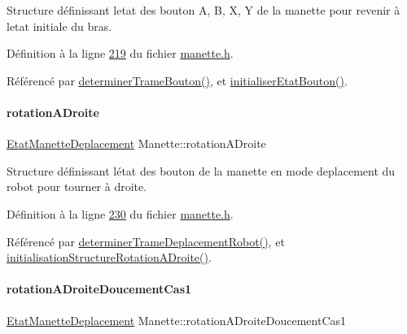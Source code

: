 Structure définissant l\textquotesingle{}etat des bouton A, B, X, Y de la manette pour revenir à l\textquotesingle{}etat initiale du bras. 



Définition à la ligne \hyperlink{manette_8h_source_l00219}{219} du fichier \hyperlink{manette_8h_source}{manette.\+h}.



Référencé par \hyperlink{manette_8cpp_source_l00393}{determiner\+Trame\+Bouton()}, et \hyperlink{manette_8cpp_source_l00313}{initialiser\+Etat\+Bouton()}.

\mbox{\label{class_manette_abeff301c65d7faeb68e7d38b8f0b5122}} 
\paragraph{\texorpdfstring{rotation\+A\+Droite}{rotationADroite}}
{\footnotesize\ttfamily \hyperlink{struct_etat_manette_deplacement}{Etat\+Manette\+Deplacement} Manette\+::rotation\+A\+Droite\hspace{0.3cm}{\ttfamily [private]}}



Structure définissant l\textquotesingle{}état des bouton de la manette en mode deplacement du robot pour tourner à droite. 



Définition à la ligne \hyperlink{manette_8h_source_l00230}{230} du fichier \hyperlink{manette_8h_source}{manette.\+h}.



Référencé par \hyperlink{manette_8cpp_source_l00341}{determiner\+Trame\+Deplacement\+Robot()}, et \hyperlink{manette_8cpp_source_l00178}{initialisation\+Structure\+Rotation\+A\+Droite()}.

\mbox{\label{class_manette_ac7bf8fa21acad7d4afe9e73c62c224a9}} 
\paragraph{\texorpdfstring{rotation\+A\+Droite\+Doucement\+Cas1}{rotationADroiteDoucementCas1}}
{\footnotesize\ttfamily \hyperlink{struct_etat_manette_deplacement}{Etat\+Manette\+Deplacement} Manette\+::rotation\+A\+Droite\+Doucement\+Cas1\hspace{0.3cm}{\ttfamily [private]}}



